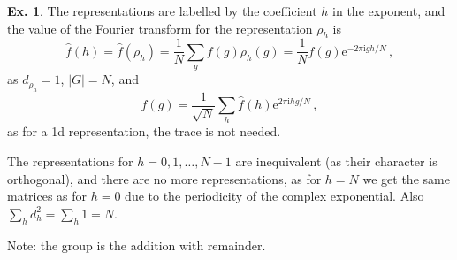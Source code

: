 \documentclass[a4paper,12pt]{article}
\def\e{\mathrm{e}}
\def\imagi{\mathrm{i}}
\theoremstyle{definition}
\newtheorem{exercise}{Ex.}[section]
\begin{document}
\begin{exercise}
 The representations are labelled by the coefficient $h$ in the exponent, and the value of the Fourier transform for the representation $\rho_h$ is
 \[
  \hat{f}(h) = \hat{f}(\rho_h)= \frac{1}{N}\sum_g f(g) \rho_h(g) = \frac{1}{N} f(g) \e^{-2\pi\imagi g h/N}\,,
 \]
 as $d_{\rho_h} = 1$, $|G|=N$, and
 \[
  f(g) = \frac{1}{\sqrt{N}}\sum_h \hat{f}(h) \e^{2\pi\imagi hg/N}\,,
 \]
 as for a 1d representation, the trace is not needed.
 
 The representations for $h=0, 1, \dots, N-1$ are inequivalent (as their character is orthogonal), and there are no more representations, as for $h=N$ we get the same matrices as for $h=0$ due to the periodicity of the complex exponential. Also $\sum_h d_h^2 = \sum_h 1 = N$.
 
 Note: the group is the addition with remainder.
\end{exercise}
\end{document}
